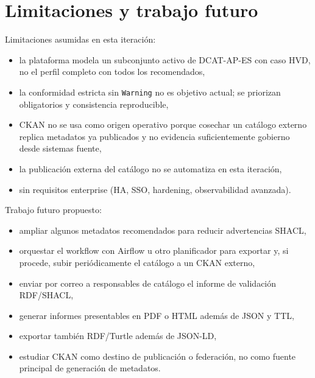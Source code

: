 \section{Limitaciones y trabajo futuro}

Limitaciones asumidas en esta iteración:
\begin{itemize}
  \item la plataforma modela un subconjunto activo de DCAT-AP-ES con caso HVD, no el perfil completo con todos los recomendados,
  \item la conformidad estricta sin \texttt{Warning} no es objetivo actual; se priorizan obligatorios y consistencia reproducible,
  \item CKAN no se usa como origen operativo porque cosechar un catálogo externo replica metadatos ya publicados y no evidencia suficientemente gobierno desde sistemas fuente,
  \item la publicación externa del catálogo no se automatiza en esta iteración,
  \item sin requisitos enterprise (HA, SSO, hardening, observabilidad avanzada).
\end{itemize}

Trabajo futuro propuesto:
\begin{itemize}
  \item ampliar algunos metadatos recomendados para reducir advertencias SHACL,
  \item orquestar el workflow con Airflow u otro planificador para exportar y, si procede, subir periódicamente el catálogo a un CKAN externo,
  \item enviar por correo a responsables de catálogo el informe de validación RDF/SHACL,
  \item generar informes presentables en PDF o HTML además de JSON y TTL,
  \item exportar también RDF/Turtle además de JSON-LD,
  \item estudiar CKAN como destino de publicación o federación, no como fuente principal de generación de metadatos.
\end{itemize}
